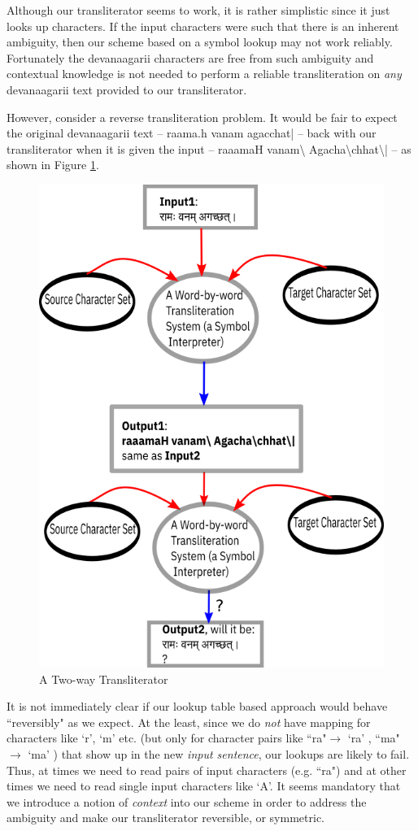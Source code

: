 \documentclass[a4paper, 12pt]{article}
\newcommand \sans[1]{
    \textsanskrit{#1}
}
\begin{document}
Although our transliterator seems to work, it is rather simplistic since it just looks up characters. If the input characters were such that there is an inherent ambiguity, then our scheme based on a symbol lookup may not work reliably. Fortunately the \sans{devanaagarii} characters are free from such ambiguity and contextual knowledge is not needed to perform a reliable transliteration on \emph{any} \sans{devanaagarii} text provided to our transliterator.

However, consider a reverse transliteration problem. It would be fair to expect the original \sans{devanaagarii} text -- \sans{raama.h vanam agacchat|} -- back with our transliterator when it is given the input -- raaamaH vanam{\textbackslash} Agacha{\textbackslash}chhat{\textbackslash}| -- as shown in Figure \ref{fig: transliterator2}.

\begin{figure}[h!]
    \centering
    \includegraphics[width=0.5\linewidth]{transliterator2.png}
    \caption{A Two-way Transliterator}
    \label{fig: transliterator2}
\end{figure}

It is not immediately clear if our lookup table based approach would behave ``reversibly" as we expect. At the least, since we do \emph{not} have mapping for characters like `r', `m' etc. (but only for character pairs like ``ra"$\rightarrow$\sans{`ra'}, ``ma"$\rightarrow$\sans{`ma'}) that show up in the new \emph{input sentence}, our lookups are likely to fail. Thus, at times we need to read pairs of input characters (e.g. ``ra") and at other times we need to read single input characters like `A'. It seems mandatory that we introduce a notion of \emph{context} into our scheme in order to address the ambiguity and make our transliterator reversible, or symmetric.
\end{document}

